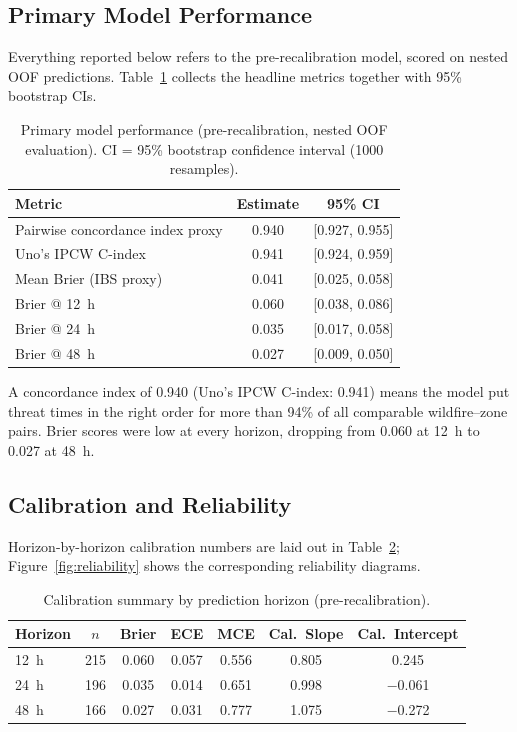 \documentclass[fire,article,submit,pdftex]{../Definitions/mdpi}
\begin{document}
\subsection{Primary Model Performance}\label{sec:primary}

Everything reported below refers to the pre-recalibration model, scored on nested OOF predictions.
Table~\ref{tab:primary} collects the headline metrics together with 95\% bootstrap CIs.

\begin{table}[!ht]
\caption{Primary model performance (pre-recalibration, nested OOF evaluation). CI = 95\% bootstrap confidence interval (1000 resamples).}\label{tab:primary}
\begin{tabular}{lcc}
\toprule
\textbf{Metric} & \textbf{Estimate} & \textbf{95\% CI} \\
\midrule
Pairwise concordance index proxy & 0.940 & [0.927, 0.955] \\
Uno's IPCW C-index               & 0.941 & [0.924, 0.959] \\
Mean Brier (IBS proxy)           & 0.041 & [0.025, 0.058] \\
Brier @ 12~h                     & 0.060 & [0.038, 0.086] \\
Brier @ 24~h                     & 0.035 & [0.017, 0.058] \\
Brier @ 48~h                     & 0.027 & [0.009, 0.050] \\
\bottomrule
\end{tabular}
\end{table}

A concordance index of 0.940 (Uno's IPCW C-index: 0.941) means the model put threat times in the right order for more than 94\% of all comparable wildfire--zone pairs.
Brier scores were low at every horizon, dropping from 0.060 at 12~h to 0.027 at 48~h.

\subsection{Calibration and Reliability}\label{sec:calibration}

Horizon-by-horizon calibration numbers are laid out in Table~\ref{tab:calibration}; Figure~\ref{fig:reliability} shows the corresponding reliability diagrams.

\begin{table}[!ht]
\caption{Calibration summary by prediction horizon (pre-recalibration).}\label{tab:calibration}
\begin{tabular}{lcccccc}
\toprule
\textbf{Horizon} & $n$ & \textbf{Brier} & \textbf{ECE} & \textbf{MCE} & \textbf{Cal.\ Slope} & \textbf{Cal.\ Intercept} \\
\midrule
12~h & 215 & 0.060 & 0.057 & 0.556 & 0.805 & 0.245 \\
24~h & 196 & 0.035 & 0.014 & 0.651 & 0.998 & $-$0.061 \\
48~h & 166 & 0.027 & 0.031 & 0.777 & 1.075 & $-$0.272 \\
\bottomrule
\end{tabular}
\end{table}
\end{document}
